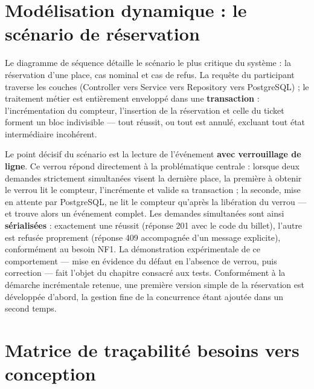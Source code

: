 \documentclass[12pt,a4paper]{report}
\begin{document}
\section{Modélisation dynamique : le scénario de réservation}

\begin{center}\end{center}

Le diagramme de séquence détaille le scénario le plus critique du système : la réservation d'une place, cas nominal et cas de refus. La requête du participant traverse les couches (Controller  vers  Service  vers  Repository  vers  PostgreSQL) ; le traitement métier est entièrement enveloppé dans une \textbf{transaction} : l'incrémentation du compteur, l'insertion de la réservation et celle du ticket forment un bloc indivisible — tout réussit, ou tout est annulé, excluant tout état intermédiaire incohérent.

Le point décisif du scénario est la lecture de l'événement \textbf{avec verrouillage de ligne}. Ce verrou répond directement à la problématique centrale : lorsque deux demandes strictement simultanées visent la dernière place, la première à obtenir le verrou lit le compteur, l'incrémente et valide sa transaction ; la seconde, mise en attente par PostgreSQL, ne lit le compteur qu'après la libération du verrou — et trouve alors un événement complet. Les demandes simultanées sont ainsi \textbf{sérialisées} : exactement une réussit (réponse 201 avec le code du billet), l'autre est refusée proprement (réponse 409 accompagnée d'un message explicite), conformément au besoin NF1. La démonstration expérimentale de ce comportement — mise en évidence du défaut en l'absence de verrou, puis correction — fait l'objet du chapitre consacré aux tests. Conformément à la démarche incrémentale retenue, une première version simple de la réservation est développée d'abord, la gestion fine de la concurrence étant ajoutée dans un second temps.

\section{Matrice de traçabilité besoins  vers  conception}
\end{document}
